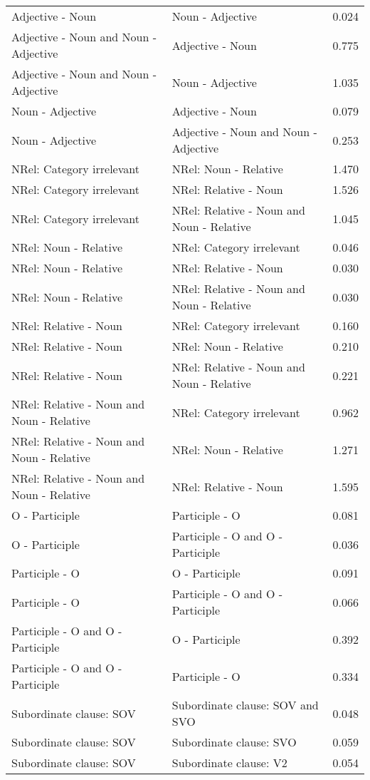 \begin{longtable}{p{.4\linewidth}p{.4\linewidth}p{.1\linewidth}}
Adjective - Noun & Noun - Adjective & 0.024\\
Adjective - Noun and Noun - Adjective & Adjective - Noun & 0.775\\
Adjective - Noun and Noun - Adjective & Noun - Adjective & 1.035\\
Noun - Adjective & Adjective - Noun & 0.079\\
Noun - Adjective & Adjective - Noun and Noun - Adjective & 0.253\\
NRel: Category irrelevant & NRel: Noun - Relative & 1.470\\
NRel: Category irrelevant & NRel: Relative - Noun & 1.526\\
NRel: Category irrelevant & NRel: Relative - Noun and Noun - Relative & 1.045\\
NRel: Noun - Relative & NRel: Category irrelevant & 0.046\\
NRel: Noun - Relative & NRel: Relative - Noun & 0.030\\
NRel: Noun - Relative & NRel: Relative - Noun and Noun - Relative & 0.030\\
NRel: Relative - Noun & NRel: Category irrelevant & 0.160\\
NRel: Relative - Noun & NRel: Noun - Relative & 0.210\\
NRel: Relative - Noun & NRel: Relative - Noun and Noun - Relative & 0.221\\
NRel: Relative - Noun and Noun - Relative & NRel: Category irrelevant & 0.962\\
NRel: Relative - Noun and Noun - Relative & NRel: Noun - Relative & 1.271\\
NRel: Relative - Noun and Noun - Relative & NRel: Relative - Noun & 1.595\\
O - Participle & Participle - O & 0.081\\
O - Participle & Participle - O and O - Participle & 0.036\\
Participle - O & O - Participle & 0.091\\
Participle - O & Participle - O and O - Participle & 0.066\\
Participle - O and O - Participle & O - Participle & 0.392\\
Participle - O and O - Participle & Participle - O & 0.334\\
Subordinate clause: SOV & Subordinate clause: SOV and SVO & 0.048\\
Subordinate clause: SOV & Subordinate clause: SVO & 0.059\\
Subordinate clause: SOV & Subordinate clause: V2 & 0.054\\

\end{longtable}
